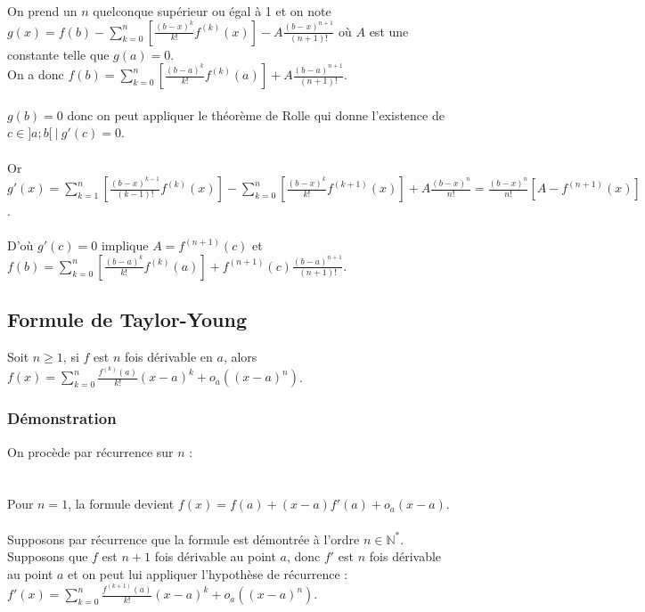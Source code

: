 \documentclass[a4paper,10pt]{book} %
\newcommand{\N}{\mathbb{N}}
\newcommand{\tq}{~|~}
\begin{document}
On prend un $n$ quelconque supérieur ou égal à 1 et on note\\$\displaystyle g(x)=f(b)-\sum\limits_{k=0}^n \left[\frac{(b-x)^k}{k!}f^{(k)}(x)\right]-A\frac{(b-x)^{n+1}}{(n+1)!}$ où $A$ est une constante telle que $g(a)=0$.\\

On a donc $\displaystyle f(b)=\sum\limits_{k=0}^n \left[\frac{(b-a)^k}{k!}f^{(k)}(a)\right]+A\frac{(b-a)^{n+1}}{(n+1)!}$.\\\\
$g(b)=0$ donc on peut appliquer le théorème de Rolle qui donne l'existence de $c \in ]a;b[\tq g'(c)=0$.\\\\
Or $\displaystyle g'(x)=\sum\limits_{k=1}^n \left[\frac{(b-x)^{k-1}}{(k-1)!}f^{(k)}(x)\right]-\sum\limits_{k=0}^n \left[\frac{(b-x)^k}{k!}f^{(k+1)}(x)\right]+A\frac{(b-x)^{n}}{n!}=\frac{(b-x)^{n}}{n!}\left[A-f^{(n+1)}(x)\right]$.\\\\

D'où $g'(c)=0$ implique $A=f^{(n+1)}(c)$ et $\displaystyle f(b)=\sum\limits_{k=0}^n \left[\frac{(b-a)^{k}}{k!}f^{(k)}(a)\right]+f^{(n+1)}(c)\frac{(b-a)^{n+1}}{(n+1)!}$.

\newpage

\subsection{Formule de Taylor-Young}
Soit $n\geq 1$, si $f$ est $n$ fois dérivable en $a$, alors $\displaystyle f(x)=\sum\limits_{k=0}^n\frac{f^{(k)}(a)}{k!}(x-a)^k+o_a((x-a)^n)$.

\subsubsection{Démonstration}
On procède par récurrence sur $n$ :\\\\\\
Pour $n=1$, la formule devient $f(x)=f(a)+(x-a)f'(a)+o_a(x-a)$.\\\\

Supposons par récurrence que la formule est démontrée à l'ordre $n\in\N^*$.\\

Supposons que $f$ est $n+1$ fois dérivable au point $a$, donc $f'$ est $n$ fois dérivable au point $a$ et on peut lui appliquer l'hypothèse de récurrence :
$\displaystyle f'(x)=\sum\limits_{k=0}^n\frac{f^{(k+1)}(a)}{k!}(x-a)^k+o_a((x-a)^n)$.
\end{document}
